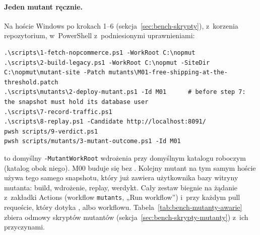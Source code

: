 \paragraph{Jeden mutant ręcznie.} Na hoście Windows po krokach 1--6
(sekcja~\ref{sec:bench-skrypty}), z~korzenia repozytorium, w~PowerShell z~podniesionymi
uprawnieniami:

\begin{lstlisting}
.\scripts\1-fetch-nopcommerce.ps1 -WorkRoot C:\nopmut
.\scripts\2-build-legacy.ps1 -WorkRoot C:\nopmut -SiteDir C:\nopmut\mutant-site -Patch mutants\M01-free-shipping-at-the-threshold.patch
.\scripts\mutants\2-deploy-mutant.ps1 -Id M01      # before step 7: the snapshot must hold its database user
.\scripts\7-record-traffic.ps1
.\scripts\8-replay.ps1 -Candidate http://localhost:8091/
pwsh scripts/9-verdict.ps1
pwsh scripts/mutants/3-mutant-outcome.ps1 -Id M01
\end{lstlisting}

 to domyślny \texttt{-MutantWorkRoot} wdrożenia przy domyślnym katalogu
roboczym  (katalog  obok niego). M00 buduje się bez
. Kolejny mutant na tym samym hoście używa tego samego snapshotu, który już
zawiera użytkownika bazy witryny mutanta: build, wdrożenie, replay, werdykt. Cały zestaw
biegnie na żądanie z~zakładki Actions (workflow \texttt{mutants}, „Run workflow”) i~przy
każdym pull requeście, który dotyka ,  albo workflowu.
Tabela~\ref{tab:bench-mutanty-awarie} zbiera odmowy skryptów mutantów
(sekcja~\ref{sec:bench-skrypty-mutanty}) z~ich przyczynami.

